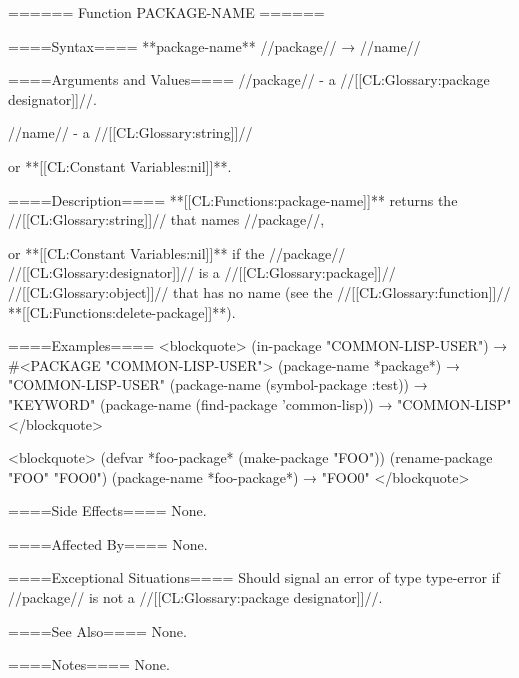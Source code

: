 ====== Function PACKAGE-NAME ======

====Syntax====
**package-name** //package// → //name//

====Arguments and Values====
//package// - a //[[CL:Glossary:package designator]]//.

//name// - a //[[CL:Glossary:string]]//

or **[[CL:Constant Variables:nil]]**.

====Description====
**[[CL:Functions:package-name]]** returns the //[[CL:Glossary:string]]// that names //package//,

or **[[CL:Constant Variables:nil]]** if the //package// //[[CL:Glossary:designator]]// is a //[[CL:Glossary:package]]// //[[CL:Glossary:object]]// that has no name (see the //[[CL:Glossary:function]]// **[[CL:Functions:delete-package]]**).

====Examples====
<blockquote> (in-package "COMMON-LISP-USER") → #<PACKAGE "COMMON-LISP-USER"> (package-name *package*) → "COMMON-LISP-USER" (package-name (symbol-package :test)) → "KEYWORD" (package-name (find-package 'common-lisp)) → "COMMON-LISP" </blockquote>

<blockquote> (defvar *foo-package* (make-package "FOO")) (rename-package "FOO" "FOO0") (package-name *foo-package*) → "FOO0" </blockquote>

====Side Effects====
None.

====Affected By====
None.

====Exceptional Situations====
Should signal an error of type type-error if //package// is not a //[[CL:Glossary:package designator]]//.

====See Also====
None.

====Notes====
None.

   
